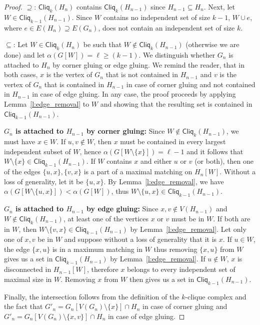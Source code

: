 \documentclass[a4paper, v2021]{lipics-v2021}
\theoremstyle{plain}
\theoremstyle{definition}
\newcommand{\Cliq}[2]{\mathsf{Cliq}_{#1}(#2)}
\begin{document}
\begin{proof}
$\supseteq$: $\Cliq{k}{H_{n}}$ contains $\Cliq{k}{H_{n-1}}$ since $H_{n-1} \subseteq H_n$. Next, let $W \in \Cliq{k-1}{H_{n-1}}$. Since $W$ contains no independent set of size $k-1$, $W \cup e$, where $e\in E(H_{n}) \supseteq E(G_n)$, does not contain an independent set of size $k$.

$\subseteq$: Let $W\in \Cliq{k}{H_{n}}$ be such that $W \not\in\Cliq{k}{H_{n-1}}$ (otherwise we are done) and let $\alpha(G[W]) = \ell \geq (k-1)$.
We distinguish whether $G_n$ is attached to $H_n$ by corner gluing or edge gluing. We remind the reader, that in both cases, $x$ is the vertex of $G_n$ that is not contained in $H_{n-1}$ and $v$ is the vertex of $G_n$ that is contained in $H_{n-1}$ in case of corner gluing and not contained in $H_{n-1}$ in case of edge gluing. In any case, the proof proceeds by applying Lemma~\ref{l:edge_removal} to $W$ and showing that the resulting set is contained in $\Cliq{k-1}{H_{n-1}}$.

\textbf{$G_n$ is attached to $H_{n-1}$ by corner gluing:} Since $W \not\in\Cliq{k}{H_{n-1}}$, we must have $x\in W$. If $u,v \not\in W$, then $x$ must be contained in every largest independent subset of $W$, hence $\alpha(G[W \setminus \{x\}]) = \ell-1$ and it follows that $W \setminus \{x\} \in \Cliq{k-1}{H_{n-1}}$. If $W$ contains $x$ and either $u$ or $v$ (or both), then one of the edges $\{u,x\},\{v,x\}$ is a part of a maximal matching on $H_n[W]$. Without a loss of generality, let it be $\{u,x\}$. By Lemma~\ref{l:edge_removal}, we have $\alpha(G[W \setminus \{u,x\}]) < \alpha(G[W])$, thus $W \setminus \{u,x\} \in \Cliq{k-1}{H_{n-1}}$.

\textbf{$G_n$ is attached to $H_{n-1}$ by edge gluing:}
Since $x,v \not \in V(H_{n-1})$ and $W \not\in\Cliq{k}{H_{n-1}}$, at least one of the vertices $x$ or $v$ must be in $W$. If both are in $W$, then $W \setminus \{v,x\} \in \Cliq{k-1}{H_{n-1}}$ by Lemma~\ref{l:edge_removal}. Let  only one of $x,v$ be in $W$ and suppose without a loss of generality that it is $x$. If $u\in W$, the edge $\{x,u\}$ is in a maximum matching in $W$ thus removing $\{x,u\}$ from $W$ gives us a set in $\Cliq{k-1}{H_{n-1}}$ by Lemma~\ref{l:edge_removal}. If $u\not\in W$, $x$ is disconnected in $H_{n-1}[W]$, therefore $x$ belongs to every independent set of maximal size in $W$. Removing $x$ from $W$ then gives us a set in $\Cliq{k-1}{H_{n-1}}$.

Finally, the intersection  follows from the definition of the $k$-clique complex and the fact that $G'_{n} = G_n[V(G_{n}) \setminus \{x\}] \cap H_n $ in case of corner gluing and $G'_{n} = G_{n}[ V(G_n) \setminus \{x,v\}] \cap H_n$ in case of edge gluing.
\end{proof}
\end{document}
